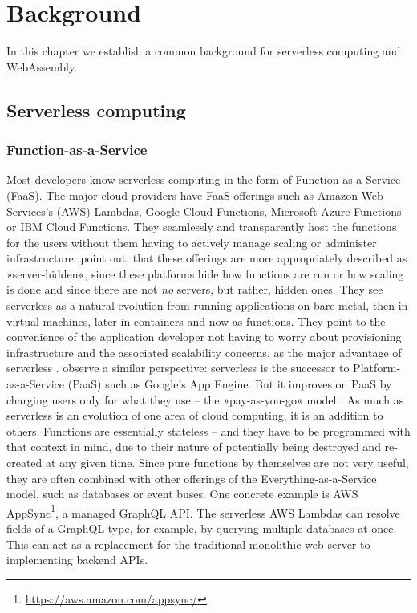 \chapter{Background}
\label{chapter:background}

In this chapter we establish a common background for serverless computing and WebAssembly.

\section{Serverless computing}

\subsection{Function-as-a-Service}

\begin{quote}
\end{quote}

Most developers know serverless computing in the form of Function-as-a-Service (FaaS). The major cloud providers have FaaS offerings such as Amazon Web Services's (AWS) Lambdas, Google Cloud Functions, Microsoft Azure Functions or IBM Cloud Functions. They seamlessly and transparently host the functions for the users without them having to actively manage scaling or administer infrastructure. \citeauthor{Fox2017} point out, that these offerings are more appropriately described as »server-hidden«, since these platforms hide how functions are run or how scaling is done and since there are not \emph{no} servers, but rather, hidden ones. They see serverless as a natural evolution from running applications on bare metal, then in virtual machines, later in containers and now as functions. They point to the convenience of the application developer not having to worry about provisioning infrastructure and the associated scalability concerns, as the major advantage of serverless \cite{Fox2017}. \citeauthor{Castro2019} observe a similar perspective: serverless is the successor to Platform-as-a-Service (PaaS) such as Google's App Engine. But it improves on PaaS by charging users only for what they use -- the »pay-as-you-go« model \cite{Castro2019}.
As much as serverless is an evolution of one area of cloud computing, it is an addition to others. Functions are essentially stateless -- and they have to be programmed with that context in mind, due to their nature of potentially being destroyed and re-created at any given time. Since pure functions by themselves are not very useful, they are often combined with other offerings of the Everything-as-a-Service model, such as databases or event buses. One concrete example is AWS AppSync\footnote{\url{https://aws.amazon.com/appsync/}}, a managed GraphQL API. The serverless AWS Lambdas can resolve fields of a GraphQL type, for example, by querying multiple databases at once. This can act as a replacement for the traditional monolithic web server to implementing backend APIs.


